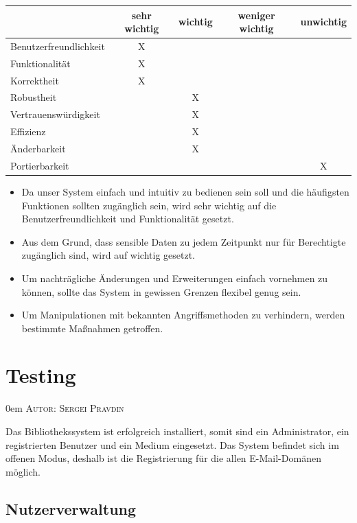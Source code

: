 \documentclass{article}
\makeatletter
\newcommand{\sectionauthor}[1]{
	{\parindent 0em \large \scshape Autor: #1 \par \nobreak \vspace*{2em}}
	\@afterheading
}
\makeatother
\begin{document}
\begin{center}
\begin{tabular}{ |l||c|c|c|c| } 
 \hline
  & sehr wichtig & wichtig & weniger wichtig & unwichtig \\
 \hline\hline
 Benutzerfreundlichkeit & X & & & \\
 \hline
 Funktionalität & X & & & \\ 
 \hline
 Korrektheit & X & & & \\
 \hline
 Robustheit & & X & & \\
 \hline
 Vertrauenswürdigkeit & & X & & \\
 \hline
 Effizienz & & X & & \\
 \hline
 Änderbarkeit & & X & & \\
 \hline
 Portierbarkeit & & &  & X \\

 \hline
\end{tabular}
\end{center}
\begin{itemize}
\item Da  unser System einfach und intuitiv zu bedienen sein soll und die häufigsten Funktionen sollten
 zugänglich sein, wird sehr wichtig  auf die Benutzerfreundlichkeit und Funktionalität gesetzt.
\item Aus dem Grund, dass sensible Daten zu jedem Zeitpunkt nur für Berechtigte zugänglich sind, wird auf  wichtig gesetzt.
\item Um nachträgliche Änderungen und Erweiterungen einfach vornehmen zu können, 
sollte das System in gewissen Grenzen flexibel genug sein.
\item Um Manipulationen mit bekannten Angriffsmethoden zu verhindern, werden bestimmte Maßnahmen getroffen.
\end{itemize}

\newpage

\section{Testing} %
\sectionauthor{Sergei Pravdin}
Das Bibliothekssystem ist erfolgreich installiert, somit sind ein Administrator, ein registrierten Benutzer und ein Medium eingesetzt. Das System befindet sich im offenen Modus, deshalb ist die Registrierung für die allen E-Mail-Domänen möglich.
\subsection{Nutzerverwaltung}
\end{document}
